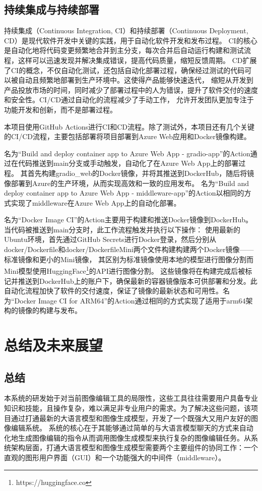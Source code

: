 \documentclass[a4paper,AutoFakeBold,oneside,12pt]{book}
\begin{document}
\section{持续集成与持续部署}
持续集成（Continuous Integration, CI）和持续部署（Continuous Deployment, CD）是现代软件开发中关键的实践，用于自动化软件开发和发布过程。
CI的核心是自动化地将代码变更频繁地合并到主分支，每次合并后自动运行构建和测试流程，这样可以迅速发现并解决集成错误，提高代码质量，缩短反馈周期。
CD扩展了CI的概念，不仅自动化测试，还包括自动化部署过程，确保经过测试的代码可以被自动且频繁地部署到生产环境中。这使得产品能够快速迭代，
缩短从开发到产品投放市场的时间，同时减少了部署过程中的人为错误，提升了软件交付的速度和安全性。CI/CD通过自动化的流程减少了手动工作，
允许开发团队更加专注于功能开发和创新，而不是部署过程。

本项目使用GitHub Actions进行CI和CD流程。除了测试外，本项目还有几个关键的CI/CD流程，主要包括部署将项目部署到Azure Web应用和Docker镜像构建。

名为“Build and deploy container app to Azure Web App - gradio-app”的Action通过在代码推送到main分支或手动触发，自动化了在Azure Web App上的部署过程。
其首先构建gradio\_web的Docker镜像，并将其推送到DockerHub，随后将镜像部署到Azure的生产环境，从而实现高效和一致的应用发布。
名为“Build and deploy container app to Azure Web App - middleware-app”的Action以相同的方式实现了middleware在Azure Web App上的自动化部署。

名为“Docker Image CI”的Action主要用于构建和推送Docker镜像到DockerHub。当代码被推送到main分支时，此工作流程触发并执行以下操作：
使用最新的Ubuntu环境，首先通过GitHub Secrets进行Docker登录，然后分别从docker/Dockerfile和docker/DockerfileMini两个文件构建构建两个Docker镜像——标准镜像和更小的Mini镜像，
其区别为标准镜像使用本地的模型进行图像分割而Mini模型使用HuggingFace\footnote{https://huggingface.co}的API进行图像分割。
这些镜像将在构建完成后被标记并推送到DockerHub上的账户下，确保最新的容器镜像版本可供部署和分发。此自动化流程加快了软件的交付速度，保证了镜像的最新状态和可用性。名为“Docker Image CI for ARM64”的Action通过相同的方式实现了适用于arm64架构的镜像的构建与发布。


\chapter{总结及未来展望} %
\section{总结}
本系统的研发始于对当前图像编辑工具的局限性，这些工具往往需要用户具备专业知识和技能，且操作复杂，难以满足非专业用户的需求。为了解决这些问题，该项目通过打通最新的大语言模型和图像生成模型，开发了一个既强大又用户友好的图像编辑系统。
系统的核心在于其能够通过简单的与大语言模型聊天的方式来自动化地生成图像编辑的指令从而调用图像生成模型来执行复杂的图像编辑任务。从系统架构层面，打通大语言模型和图像生成模型需要两个主要组件的协同工作：一个直观的图形用户界面（GUI）和一个功能强大的中间件（middleware）。
\end{document}
